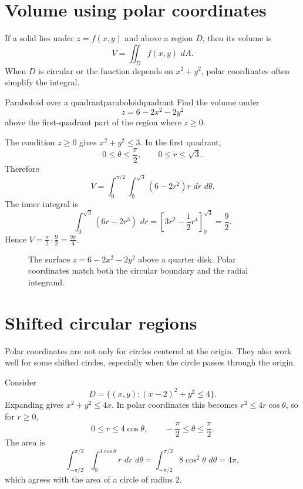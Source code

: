 \documentclass[11pt]{article}
\newcommand{\dd}{\,d}
\begin{document}
\section{Volume using polar coordinates}

If a solid lies under $z=f(x,y)$ and above a region $D$, then its volume is
\[
V=\iint_D f(x,y)\,\dd A.
\]
When $D$ is circular or the function depends on $x^2+y^2$, polar coordinates often simplify the integral.

\begin{workedexample}{Paraboloid over a quadrant}{paraboloidquadrant}
Find the volume under
\[
z=6-2x^2-2y^2
\]
above the first-quadrant part of the region where $z\ge0$.

The condition $z\ge0$ gives $x^2+y^2\le3$. In the first quadrant,
\[
0\le\theta\le\frac{\pi}{2},\qquad 0\le r\le\sqrt3.
\]
Therefore
\[
V=\int_0^{\pi/2}\int_0^{\sqrt3}(6-2r^2)r\,\dd r\,\dd\theta.
\]
The inner integral is
\[
\int_0^{\sqrt3}(6r-2r^3)\,\dd r
=\left[3r^2-\frac12r^4\right]_0^{\sqrt3}=\frac92.
\]
Hence $V=\frac{\pi}{2}\cdot\frac92=\frac{9\pi}{4}$.
\end{workedexample}

\begin{figure}[H]
\centering
{}
\caption{The surface $z=6-2x^2-2y^2$ above a quarter disk. Polar coordinates match both the circular boundary and the radial integrand.}
\end{figure}

\section{Shifted circular regions}

Polar coordinates are not only for circles centered at the origin. They also work well for some shifted circles, especially when the circle passes through the origin.

Consider
\[
D=\{(x,y):(x-2)^2+y^2\le4\}.
\]
Expanding gives $x^2+y^2\le4x$. In polar coordinates this becomes $r^2\le4r\cos\theta$, so for $r\ge0$,
\[
0\le r\le4\cos\theta,
\qquad -\frac{\pi}{2}\le\theta\le\frac{\pi}{2}.
\]
The area is
\[
\int_{-\pi/2}^{\pi/2}\int_0^{4\cos\theta}r\,\dd r\,\dd\theta
=\int_{-\pi/2}^{\pi/2}8\cos^2\theta\,\dd\theta=4\pi,
\]
which agrees with the area of a circle of radius $2$.
\end{document}
